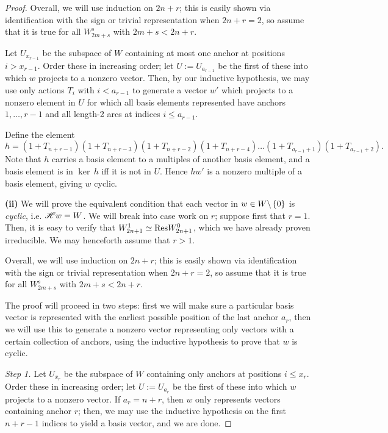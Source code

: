 \documentclass{amsart}
\begin{document}
\begin{proof}
  Overall, we will use induction on $2n + r$;
  this is easily shown via identification with the sign or trivial representation when $2n + r = 2$, so assume that it is true for all $W_{2m + s}^s$ with $2m + s < 2n + r$.

  Let $U_{x_{r-1}}$ be the subspace of $W$ containing at most one anchor at positions $i > x_{r-1}$.
  Order these in increasing order;
  let $U := U_{a_{r-1}}$ be the first of these into which $w$ projects to a nonzero vector.
  Then, by our inductive hypothesis, we may use only actions $T_i$ with $i < a_{r-1}$ to generate a vector $w'$ which projects to a nonzero element in $U$ for which all basis elements represented have anchors $1,\dots,r-1$ and all length-2 arcs at indices $i \leq a_{r-1}$.

  Define the element
  \[
    h = (1 + T_{n + r - 1})(1 + T_{n+r-3})(1 + T_{n+r-2})(1 + T_{n + r - 4})\dots(1 + T_{a_{r-1} +1})(1 + T_{a_{r-1}+2}).
  \]
  Note that $h$ carries a basis element to a multiples of another basis element, and a basis element is in $\ker \, h$ iff it is not in $U$.
  Hence $hw'$ is a nonzero multiple of a basis element, giving $w$ cyclic.
  \fi

  \vspace{\sectionsep}
  \textbf{(ii)}
  We will prove the equivalent condition that each vector in $w \in W\backslash \left\{ 0 \right\}$ is \emph{cyclic}, i.e. $\mathscr{H} w = W$.
  We will break into case work on $r$;
  suppose first that $r = 1$.
  Then, it is easy to verify that $W_{2n + 1}^1 \simeq \text{Res} W_{2n + 1}^0$, which we have already proven irreducible.
  We may henceforth assume that $r > 1$.
  
  Overall, we will use induction on $2n + r$;
  this is easily shown via identification with the sign or trivial representation when $2n + r = 2$, so assume that it is true for all $W_{2m + s}^s$ with $2m + s < 2n + r$.
  
  The proof will proceed in two steps: first we will make sure a particular basis vector is represented with the earliest possible position of the last anchor $a_r$, then we will use this to generate a nonzero vector representing only vectors with a certain collection of anchors, using the inductive hypothesis to prove that $w$ is cyclic.
  
  \vspace{\sectionsep}
  \textit{Step 1.}
  Let $U_{x_r}$ be the subspace of $W$ containing only anchors at positions $i \leq x_r$.
  Order these in increasing order;
  let $U := U_{a_r}$ be the first of these into which $w$ projects to a nonzero vector.
  If $a_r = n + r$, then $w$ only represents vectors containing anchor $r$;
  then, we may use the inductive hypothesis on the first $n + r - 1$ indices to yield a basis vector, and we are done.


\end{proof}
\end{document}
